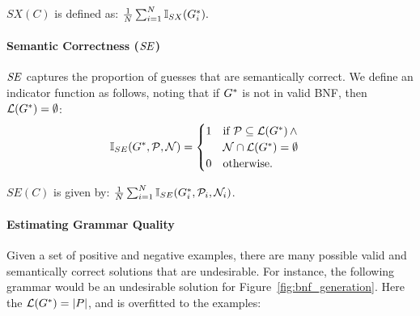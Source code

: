 \noindent $SX(C)$ is defined as:
$
\frac{1}{N}\sum_{i=1}^N \mathbb{I}_{SX}(G^*_{i}).
$

\paragraph{Semantic Correctness ($\mathit{SE}$)} $\mathit{SE}$ captures the proportion of guesses that are semantically correct.
%
We define an indicator function as follows, noting that if $G^*$ is not in valid BNF, then $\mathcal{L}(G^*) = \emptyset$:
\begin{align*}
\mathbb{I}_{SE}(G^*,\mathcal{P},\mathcal{N}) &=
\begin{cases}
1 & \text{if $\mathcal{P} \subseteq \mathcal{L}(G^*) \,\wedge$} \\
& \mathcal{N} \cap \mathcal{L}(G^*) = \emptyset \\
0 & \text{otherwise.}
\end{cases}
\end{align*}



\noindent$SE(C)$ is given by:
$
\frac{1}{N}\sum_{i=1}^N \mathbb{I}_{SE}(G^*_{i},\mathcal{P}_i,\mathcal{N}_i)
$.

\paragraph{Estimating Grammar Quality}
Given a set of positive and negative examples, there are many possible valid and semantically correct solutions that are undesirable. For instance, the following grammar would be an undesirable solution for Figure~\ref{fig:bnf_generation}. Here the $\mathcal{L}(G^*) = |P|$, and is overfitted to the examples:

